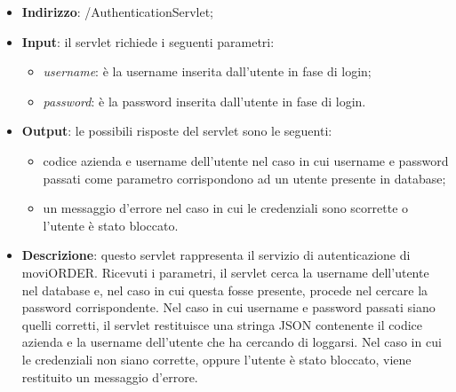 
\begin{itemize}
	\item \textbf{Indirizzo}: /AuthenticationServlet;
	\item \textbf{Input}: il servlet richiede i seguenti parametri:
		\begin{itemize}
			\item \textit{username}: è la username inserita dall'utente in fase di login;
			\item \textit{password}: è la password inserita dall'utente in fase di login.
		\end{itemize}
	\item \textbf{Output}: le possibili risposte del servlet sono le seguenti:
		\begin{itemize}
			\item codice azienda e username dell'utente nel caso in cui username e password passati come parametro corrispondono ad un utente presente in database;
			\item un messaggio d'errore nel caso in cui le credenziali sono scorrette o l'utente è stato bloccato. 
		\end{itemize}
		\item \textbf{Descrizione}: questo servlet rappresenta il servizio di autenticazione di moviORDER. Ricevuti i parametri, il servlet cerca la username dell'utente nel database e, nel caso in cui questa fosse presente, procede nel cercare la password corrispondente. Nel caso in cui username e password passati siano quelli corretti, il servlet restituisce una stringa JSON contenente il codice azienda e la username dell'utente che ha cercando di loggarsi. Nel caso in cui le credenziali non siano corrette, oppure l'utente è stato bloccato, viene restituito un messaggio d'errore.
\end{itemize}


